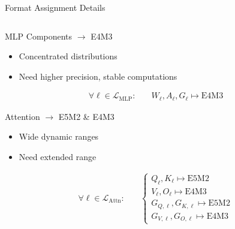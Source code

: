 \begin{frame}[squeeze]{Format Assignment Details}

\begin{columns}[c]
\begin{column}{0.58\textwidth}
    \begin{block}{MLP Components $\rightarrow$ E4M3}
    \small
    \begin{itemize}
        \item Concentrated distributions
        \item Need higher precision, stable computations
    \end{itemize}
    {\footnotesize  \begin{align}
\forall \ell \in \mathcal{L}_{\mathrm{MLP}}: \quad &W_{\ell}, A_{\ell}, G_{\ell} \mapsto \text{E4M3} \label{eq:mlp_assignment}
\end{align}}
    \end{block}


    \begin{block}{Attention $\rightarrow$ E5M2 \& E4M3} 
    \small
    \begin{itemize}
        \item Wide dynamic ranges
        \item Need extended range
    \end{itemize}
    {\footnotesize  \begin{align}
\forall \ell \in \mathcal{L}_{\mathrm{Attn}}: \quad &\begin{cases}
Q_{\ell}, K_{\ell} \mapsto \text{E5M2} \\
V_{\ell}, O_{\ell} \mapsto \text{E4M3} \\
G_{Q,\ell}, G_{K,\ell} \mapsto \text{E5M2} \\
G_{V,\ell}, G_{O,\ell} \mapsto \text{E4M3}
\end{cases} \label{eq:attn_assignment}
\end{align}}
    \end{block}
\end{column}


\end{columns}
\end{frame}
